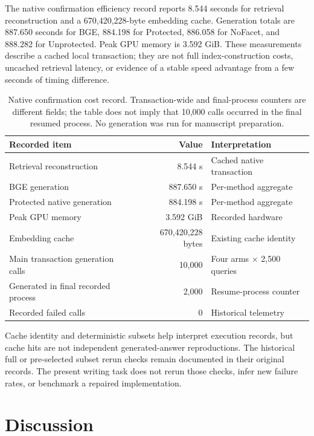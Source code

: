 \documentclass[11pt,a4paper]{article}
\begin{document}
The native confirmation efficiency record reports 8.544 seconds for retrieval
reconstruction and a 670,420,228-byte embedding cache. Generation totals are
887.650 seconds for BGE, 884.198 for Protected, 886.058 for NoFacet, and
888.282 for Unprotected. Peak GPU memory is 3.592 GiB. These measurements
describe a cached local transaction; they are not full index-construction
costs, uncached retrieval latency, or evidence of a stable speed advantage
from a few seconds of timing difference.

\begin{table}[t]
\centering\small
\begin{tabular}{@{}p{}rp{}@{}}
\toprule
Recorded item & Value & Interpretation\\
\midrule
Retrieval reconstruction & 8.544 s & Cached native transaction\\
BGE generation & 887.650 s & Per-method aggregate\\
Protected native generation & 884.198 s & Per-method aggregate\\
Peak GPU memory & 3.592 GiB & Recorded hardware\\
Embedding cache & 670,420,228 bytes & Existing cache identity\\
Main transaction generation calls & 10,000 & Four arms $\times$ 2,500 queries\\
Generated in final recorded process & 2,000 & Resume-process counter\\
Recorded failed calls & 0 & Historical telemetry\\
\bottomrule
\end{tabular}
\caption{Native confirmation cost record. Transaction-wide and final-process
counters are different fields; the table does not imply that 10,000 calls
occurred in the final resumed process. No generation was run for manuscript
preparation.}
\label{tab:cost}
\end{table}

Cache identity and deterministic subsets help interpret execution records,
but cache hits are not independent generated-answer reproductions. The
historical full or pre-selected subset rerun checks remain documented in
their original records. The present writing task does not rerun those
checks, infer new failure rates, or benchmark a repaired implementation.

\section{Discussion}
\end{document}
